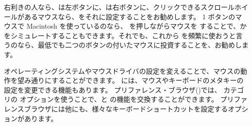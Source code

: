 \documentclass[a4paper,10pt,twoside]{book}
\begin{document}





右利きの人なら、\click は左ボタンに、\actclick は右ボタンに、クリックできるスクロールホイールがあるマウスなら、\metaclick をそれに設定することをお勧めします。
1 ボタンのマウスで Macintosh を使っているのなら、\clover{} を押しながらマウスを \click することで、\actclick か \metaclick をシミュレートすることもできます。それでも、これから \pharo を頻繁に使おうと言うのなら、最低でも二つのボタンの付いたマウスに投資することを、お勧めします。

オペレーティングシステムやマウスドライバの設定を変えることで、マウスの動作を望み通りにすることができます。
\pharo には、マウスやキーボードのメタキーの設定を変更できる機能もあります。
プリファレンス・ブラウザ()では、 カテゴリの  オプションを使うことで、\actclick と \metaclick の機能を交換することができます。
プリファレンスブラウザには他にも、様々なキーボードショートカットを設定するオプションがあります。
\end{document}

